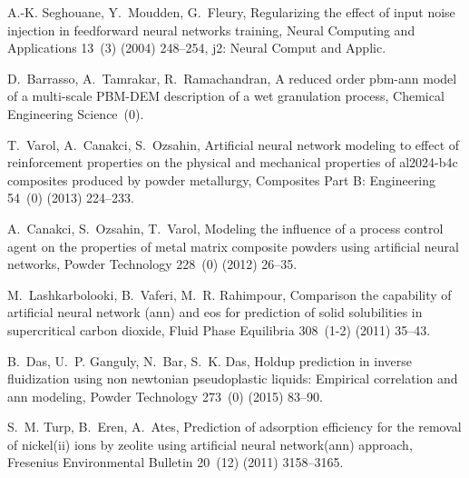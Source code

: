 \documentclass{llncs}
\begin{document}
\begin{thebibliography}{10}
A.-K. Seghouane, Y.~Moudden, G.~Fleury, Regularizing the effect of input noise
  injection in feedforward neural networks training, Neural Computing and
  Applications 13~(3) (2004) 248--254, j2: Neural Comput and Applic.

D.~Barrasso, A.~Tamrakar, R.~Ramachandran, A reduced order pbm-ann model of a
  multi-scale PBM-DEM description of a wet granulation process, Chemical
  Engineering Science~(0).

T.~Varol, A.~Canakci, S.~Ozsahin, Artificial neural network modeling to effect
  of reinforcement properties on the physical and mechanical properties of
  al2024-b4c composites produced by powder metallurgy, Composites Part B:
  Engineering 54~(0) (2013) 224--233.

A.~Canakci, S.~Ozsahin, T.~Varol, Modeling the influence of a process control
  agent on the properties of metal matrix composite powders using artificial
  neural networks, Powder Technology 228~(0) (2012) 26--35.

M.~Lashkarbolooki, B.~Vaferi, M.~R. Rahimpour, Comparison the capability of
  artificial neural network (ann) and eos for prediction of solid solubilities
  in supercritical carbon dioxide, Fluid Phase Equilibria 308~(1-2) (2011)
  35--43.

B.~Das, U.~P. Ganguly, N.~Bar, S.~K. Das, Holdup prediction in inverse
  fluidization using non newtonian pseudoplastic liquids: Empirical correlation
  and ann modeling, Powder Technology 273~(0) (2015) 83--90.

S.~M. Turp, B.~Eren, A.~Ates, Prediction of adsorption efficiency for the
  removal of nickel(ii) ions by zeolite using artificial neural network(ann)
  approach, Fresenius Environmental Bulletin 20~(12) (2011) 3158--3165.
\end{thebibliography}
\end{document}
